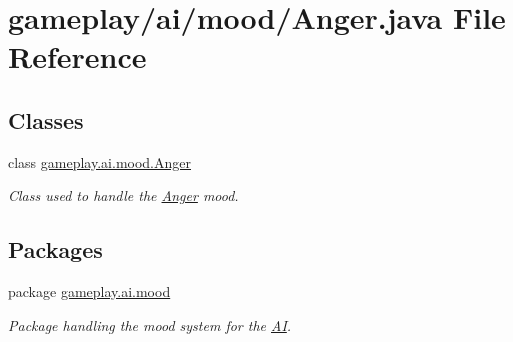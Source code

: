 \hypertarget{a00044}{\section{gameplay/ai/mood/\-Anger.java File Reference}
\label{a00044}
}
\subsection*{Classes}
\begin{DoxyCompactItemize}
\item 
class \hyperlink{a00003}{gameplay.\-ai.\-mood.\-Anger}
\begin{DoxyCompactList}\small\item\em Class used to handle the \hyperlink{a00003}{Anger} mood. \end{DoxyCompactList}\end{DoxyCompactItemize}
\subsection*{Packages}
\begin{DoxyCompactItemize}
\item 
package \hyperlink{a00083}{gameplay.\-ai.\-mood}
\begin{DoxyCompactList}\small\item\em Package handling the mood system for the \hyperlink{a00001}{A\-I}. \end{DoxyCompactList}\end{DoxyCompactItemize}
